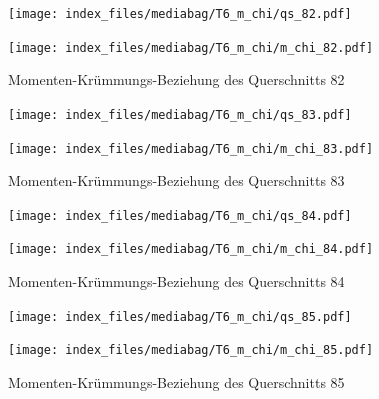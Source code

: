 \documentclass[
  11pt,
  letterpaper,
]{scrreprt}
\begin{document}
\begin{figure}[H]

\begin{minipage}{0.50\linewidth}
\texttt{[image: index\_files/mediabag/T6\_m\_chi/qs\_82.pdf]}\end{minipage}%
%
\begin{minipage}{0.50\linewidth}
\texttt{[image: index\_files/mediabag/T6\_m\_chi/m\_chi\_82.pdf]}\end{minipage}%

\caption{\label{fig-mchi_anhang}Momenten-Krümmungs-Beziehung des
Querschnitts 82}

\end{figure}%

\begin{figure}[H]

\begin{minipage}{0.50\linewidth}
\texttt{[image: index\_files/mediabag/T6\_m\_chi/qs\_83.pdf]}\end{minipage}%
%
\begin{minipage}{0.50\linewidth}
\texttt{[image: index\_files/mediabag/T6\_m\_chi/m\_chi\_83.pdf]}\end{minipage}%

\caption{\label{fig-mchi_anhang}Momenten-Krümmungs-Beziehung des
Querschnitts 83}

\end{figure}%

\begin{figure}[H]

\begin{minipage}{0.50\linewidth}
\texttt{[image: index\_files/mediabag/T6\_m\_chi/qs\_84.pdf]}\end{minipage}%
%
\begin{minipage}{0.50\linewidth}
\texttt{[image: index\_files/mediabag/T6\_m\_chi/m\_chi\_84.pdf]}\end{minipage}%

\caption{\label{fig-mchi_anhang}Momenten-Krümmungs-Beziehung des
Querschnitts 84}

\end{figure}%

\begin{figure}[H]

\begin{minipage}{0.50\linewidth}
\texttt{[image: index\_files/mediabag/T6\_m\_chi/qs\_85.pdf]}\end{minipage}%
%
\begin{minipage}{0.50\linewidth}
\texttt{[image: index\_files/mediabag/T6\_m\_chi/m\_chi\_85.pdf]}\end{minipage}%

\caption{\label{fig-mchi_anhang}Momenten-Krümmungs-Beziehung des
Querschnitts 85}

\end{figure}%
\end{document}
